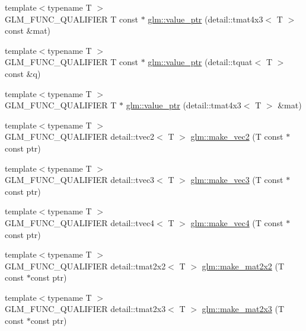 \begin{DoxyCompactItemize}
\item 
{\footnotesize template$<$typename T $>$ }\\\-G\-L\-M\-\_\-\-F\-U\-N\-C\-\_\-\-Q\-U\-A\-L\-I\-F\-I\-E\-R \-T const $\ast$ \hyperlink{group__gtc__type__ptr_gacca7d201301551a24dbf7eef343a14c1}{glm\-::value\-\_\-ptr} (detail\-::tmat4x3$<$ \-T $>$ const \&mat)
\item 
{\footnotesize template$<$typename T $>$ }\\\-G\-L\-M\-\_\-\-F\-U\-N\-C\-\_\-\-Q\-U\-A\-L\-I\-F\-I\-E\-R \-T const $\ast$ \hyperlink{group__gtc__type__ptr_ga348519eaf9bb56244727eabb314f6892}{glm\-::value\-\_\-ptr} (detail\-::tquat$<$ \-T $>$ const \&q)
\item 
{\footnotesize template$<$typename T $>$ }\\\-G\-L\-M\-\_\-\-F\-U\-N\-C\-\_\-\-Q\-U\-A\-L\-I\-F\-I\-E\-R \-T $\ast$ \hyperlink{group__gtc__type__ptr_gae821d2d76715dfe8eb4a9c7eac845dc4}{glm\-::value\-\_\-ptr} (detail\-::tmat4x3$<$ \-T $>$ \&mat)
\item 
{\footnotesize template$<$typename T $>$ }\\\-G\-L\-M\-\_\-\-F\-U\-N\-C\-\_\-\-Q\-U\-A\-L\-I\-F\-I\-E\-R \*
detail\-::tvec2$<$ \-T $>$ \hyperlink{group__gtc__type__ptr_ga422b78b752695fecbd9f938120add926}{glm\-::make\-\_\-vec2} (\-T const $\ast$const ptr)
\item 
{\footnotesize template$<$typename T $>$ }\\\-G\-L\-M\-\_\-\-F\-U\-N\-C\-\_\-\-Q\-U\-A\-L\-I\-F\-I\-E\-R \*
detail\-::tvec3$<$ \-T $>$ \hyperlink{group__gtc__type__ptr_ga9f5720be41fd0900e62df3f860200ff2}{glm\-::make\-\_\-vec3} (\-T const $\ast$const ptr)
\item 
{\footnotesize template$<$typename T $>$ }\\\-G\-L\-M\-\_\-\-F\-U\-N\-C\-\_\-\-Q\-U\-A\-L\-I\-F\-I\-E\-R \*
detail\-::tvec4$<$ \-T $>$ \hyperlink{group__gtc__type__ptr_ga0d220ea80b0fed9d164108f84a5107f9}{glm\-::make\-\_\-vec4} (\-T const $\ast$const ptr)
\item 
{\footnotesize template$<$typename T $>$ }\\\-G\-L\-M\-\_\-\-F\-U\-N\-C\-\_\-\-Q\-U\-A\-L\-I\-F\-I\-E\-R \*
detail\-::tmat2x2$<$ \-T $>$ \hyperlink{group__gtc__type__ptr_ga73b043e4238811832471bfcfd7257900}{glm\-::make\-\_\-mat2x2} (\-T const $\ast$const ptr)
\item 
{\footnotesize template$<$typename T $>$ }\\\-G\-L\-M\-\_\-\-F\-U\-N\-C\-\_\-\-Q\-U\-A\-L\-I\-F\-I\-E\-R \*
detail\-::tmat2x3$<$ \-T $>$ \hyperlink{group__gtc__type__ptr_ga2d3313e5b4e84062b8747a439ac9c789}{glm\-::make\-\_\-mat2x3} (\-T const $\ast$const ptr)

\end{DoxyCompactItemize}

